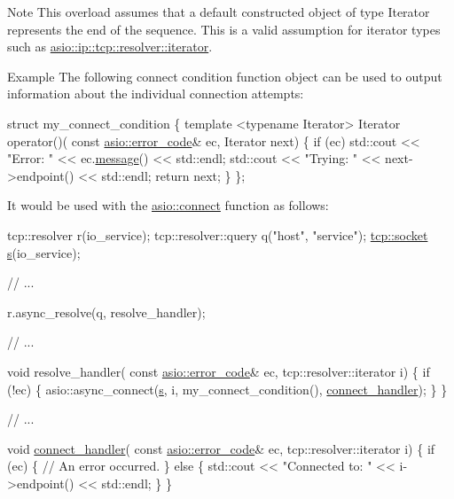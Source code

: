 \begin{DoxyNote}{Note}
This overload assumes that a default constructed object of type {\ttfamily Iterator} represents the end of the sequence. This is a valid assumption for iterator types such as {\ttfamily \hyperlink{classasio_1_1ip_1_1basic__resolver_ad1cc50a31ba4971329a34eb01ef5a21c}{asio\+::ip\+::tcp\+::resolver\+::iterator}}.
\end{DoxyNote}
\begin{DoxyParagraph}{Example}
The following connect condition function object can be used to output information about the individual connection attempts\+: 
\begin{DoxyCode}
 \textcolor{keyword}{struct }my\_connect\_condition
\{
  \textcolor{keyword}{template} <\textcolor{keyword}{typename} Iterator>
  Iterator operator()(
      \textcolor{keyword}{const} \hyperlink{classasio_1_1error__code}{asio::error\_code}& ec,
      Iterator next)
  \{
    \textcolor{keywordflow}{if} (ec) std::cout << \textcolor{stringliteral}{"Error: "} << ec.\hyperlink{classasio_1_1error__code_a9e15b346b9ec23275530835d9c150711}{message}() << std::endl;
    std::cout << \textcolor{stringliteral}{"Trying: "} << next->endpoint() << std::endl;
    \textcolor{keywordflow}{return} next;
  \}
\}; 
\end{DoxyCode}
 It would be used with the \hyperlink{group__connect_ga29acd61d7a875cef7dbd1f892be2906c}{asio\+::connect} function as follows\+: 
\begin{DoxyCode}
 tcp::resolver r(io\_service);
tcp::resolver::query q(\textcolor{stringliteral}{"host"}, \textcolor{stringliteral}{"service"});
\hyperlink{namespacewebsocketpp_1_1transport_1_1asio_1_1socket_1_1error_a828ddaa5ed63a761e1b557465a35f05aa0c31b356014843e1d09514e794a539a7}{tcp::socket} \hyperlink{group__async__connect_ga31ab74b9ea6c77932dddd016cfc7920a}{s}(io\_service);

\textcolor{comment}{// ...}

r.async\_resolve(q, resolve\_handler);

\textcolor{comment}{// ...}

\textcolor{keywordtype}{void} resolve\_handler(
    \textcolor{keyword}{const} \hyperlink{classasio_1_1error__code}{asio::error\_code}& ec,
    tcp::resolver::iterator i)
\{
  \textcolor{keywordflow}{if} (!ec)
  \{
    asio::async\_connect(\hyperlink{group__async__connect_ga31ab74b9ea6c77932dddd016cfc7920a}{s}, i,
        my\_connect\_condition(),
        \hyperlink{namespacewebsocketpp_1_1transport_ac392fca34e946b48414278c0c3addfa5}{connect\_handler});
  \}
\}

\textcolor{comment}{// ...}

\textcolor{keywordtype}{void} \hyperlink{namespacewebsocketpp_1_1transport_ac392fca34e946b48414278c0c3addfa5}{connect\_handler}(
    \textcolor{keyword}{const} \hyperlink{classasio_1_1error__code}{asio::error\_code}& ec,
    tcp::resolver::iterator i)
\{
  \textcolor{keywordflow}{if} (ec)
  \{
    \textcolor{comment}{// An error occurred.}
  \}
  \textcolor{keywordflow}{else}
  \{
    std::cout << \textcolor{stringliteral}{"Connected to: "} << i->endpoint() << std::endl;
  \}
\} 
\end{DoxyCode}

\end{DoxyParagraph}
